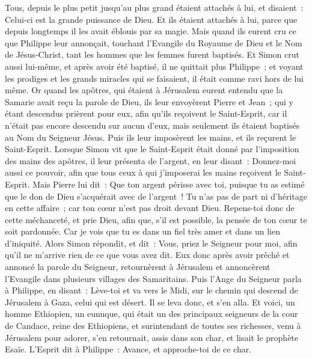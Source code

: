 \begin{multicols}{2}
Tous, depuis le plus petit jusqu'au plus grand étaient attachés à lui, et disaient~: Celui-ci est la grande puissance de Dieu.
Et ils étaient attachés à lui, parce que depuis longtemps il les avait éblouis par sa magie.
Mais quand ils eurent cru ce que Philippe leur annonçait, touchant l'Evangile du Royaume de Dieu et le Nom de Jésus-Christ, tant les hommes que les femmes furent baptisés.
Et Simon crut aussi lui-même, et après avoir été baptisé, il ne quittait plus Philippe~; et voyant les prodiges et les grands miracles qui se faisaient, il était comme ravi hors de lui même.
Or quand les apôtres, qui étaient à Jérusalem eurent entendu que la Samarie avait reçu la parole de Dieu, ils leur envoyèrent Pierre et Jean~;
qui y étant descendus prièrent pour eux, afin qu'ils reçoivent le Saint-Esprit,
car il n'était pas encore descendu sur aucun d'eux, mais seulement ils étaient baptisés au Nom du Seigneur Jésus.
Puis ils leur imposèrent les mains, et ils reçurent le Saint-Esprit.
Lorsque Simon vit que le Saint-Esprit était donné par l'imposition des mains des apôtres, il leur présenta de l'argent,
en leur disant~: Donnez-moi aussi ce pouvoir, afin que tous ceux à qui j'imposerai les mains reçoivent le Saint-Esprit.
Mais Pierre lui dit~: Que ton argent périsse avec toi, puisque tu as estimé que le don de Dieu s'acquérait avec de l'argent~!
Tu n'as pas de part ni d'héritage en cette affaire~; car ton cœur n'est pas droit devant Dieu.
Repens-toi donc de cette méchanceté, et prie Dieu, afin que, s'il est possible, la pensée de ton cœur te soit pardonnée.
Car je vois que tu es dans un fiel très amer et dans un lien d'iniquité.
Alors Simon répondit, et dit~: Vous, priez le Seigneur pour moi, afin qu'il ne m'arrive rien de ce que vous avez dit. 
Eux donc après avoir prêché et annoncé la parole du Seigneur, retournèrent à Jérusalem et annoncèrent l'Evangile dans plusieurs villages des Samaritains.
Puis l'Ange du Seigneur parla à Philippe, en disant~: Lève-toi et va vers le Midi, sur le chemin qui descend de Jérusalem à Gaza, celui qui est désert.
Il se leva donc, et s'en alla. Et voici, un homme Ethiopien, un eunuque, qui était un des principaux seigneurs de la cour de Candace, reine des Ethiopiens, et surintendant de toutes ses richesses, venu à Jérusalem pour adorer,
s'en retournait, assis dans son char, et lisait le prophète Esaïe.
L'Esprit dit à Philippe~: Avance, et approche-toi de ce char.

\end{multicols}
